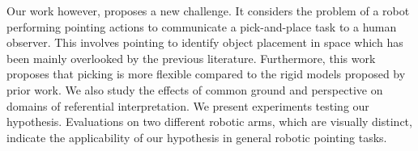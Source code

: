 Our work however, proposes a new challenge. It considers the problem of a robot performing pointing actions to communicate a pick-and-place task to a human observer. This involves pointing to identify object placement in space which has been mainly overlooked by the previous literature. Furthermore, this work proposes that picking is more flexible compared to the rigid models proposed by prior work. We also study the effects of common ground and perspective on domains of referential interpretation. We present experiments testing our hypothesis. Evaluations on two different robotic arms, which are visually distinct, indicate the applicability of our hypothesis in general robotic pointing tasks.














